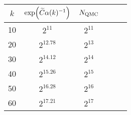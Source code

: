\begin{tabular}{Sc Sc Sc }

\toprule

$k$ & $\exp\mleft(\Ctilde\alpha(k)^{-1}\mright)$ & $N_{\mathrm{QMC}}$\\
\midrule

10 &                                   $2^{11}$ &  $2^{11}$ \\

20 &                                $2^{12.78}$ &  $2^{13}$ \\

30 &                                $2^{14.12}$ &  $2^{14}$ \\

40 &                                $2^{15.26}$ &  $2^{15}$ \\

50 &                                $2^{16.28}$ &  $2^{16}$ \\

60 &                                $2^{17.21}$ &  $2^{17}$ \\

\bottomrule

\end{tabular}

